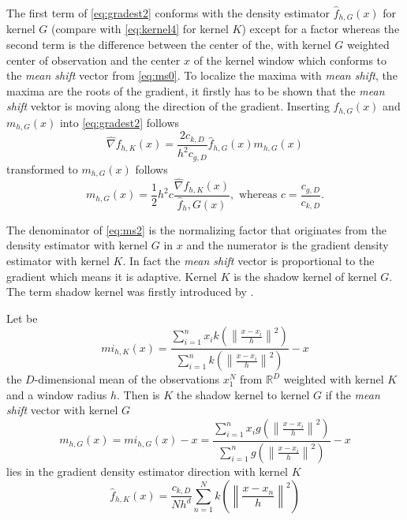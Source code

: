 The first term of \autoref{eq:gradest2} conforms with the density
estimator $\hat{f}_{h,G}(x)$ for kernel $G$ (compare with
\autoref{eq:kernel4} for kernel $K$) except for a factor whereas the
second term is the difference between the center of the, with kernel
$G$ weighted center of observation and the center $x$ of the kernel
window which conforms to the \emph{mean shift} vector from
\autoref{eq:ms0}.  To localize the maxima with \emph{mean shift}, the
maxima are the roots of the gradient, it firstly has to be shown that
the \emph{mean shift} vektor is moving along the direction of the
gradient. Inserting $\hat{f}_{h,G}(x)$ and $m_{h,G}(x)$ into
\autoref{eq:gradest2} follows
\begin{equation}\label{eq:ms1}
  \hat{\nabla} f_{h,K}(x) = \frac{2c_{k,D}}{h^2c_{g,D}} 
  \hat{f}_{h,G}(x)m_{h,G}(x)
\end{equation}
transformed to $m_{h,G}(x)$ follows
\begin{equation}\label{eq:ms2}
  m_{h,G}(x) = \frac{1}{2}h^2 c 
  \frac{\hat{\nabla} f_{h,K}(x)}{\hat{f}_h,G(x)}, \textrm{ whereas } 
  c = \frac{c_{g,D}}{c_{k,D}}.
\end{equation}

The denominator of \autoref{eq:ms2} is the normalizing factor that
originates from the density estimator with kernel $G$ in $x$ and the
numerator is the gradient density estimator with kernel $K$. In fact
the \emph{mean shift} vector is proportional to the gradient which
means it is adaptive. Kernel $K$ is the shadow kernel of kernel
$G$. The term shadow kernel was firstly introduced by
\citeauthor{citeulike:2522867} \citep{citeulike:2522867}.

Let be
\begin{equation}\label{eq:msi}
  mi_{h,K}(x) = \frac{\sum_{i=1}^n x_i k\left(\left\lVert \frac{x - x_i}{h}
      \right\rVert^2\right)}{\sum_{i=1}^n k\left(\left\lVert \frac{x - x_i}{h}
      \right\rVert^2\right)} -x
\end{equation}
the $D$-dimensional mean of the observations $x_1^N$ from
$\mathbb{R}^D$ weighted with kernel $K$ and a window radius $h$. Then
is $K$ the shadow kernel to kernel $G$ if the \emph{mean shift} vector
with kernel $G$
\begin{equation}\label{eq:msi2}
  m_{h,G}(x) = mi_{h,G}(x) - x = 
  \frac{\sum_{i=1}^n x_i g\left(\left\lVert \frac{x - x_i}{h}
      \right\rVert^2\right)}{\sum_{i=1}^n g\left(\left\lVert \frac{x - x_i}{h}
      \right\rVert^2\right)} -x
\end{equation}
lies in the gradient density estimator direction with kernel $K$
\begin{equation}\label{eq:msi3}
  \hat{f}_{h,K}(x) = \frac{c_{k,D}}{Nh^d}
  \sum_{n = 1}^N k\left(\left\lVert \frac{x-x_n}{h} \right\rVert^2\right)
\end{equation}

